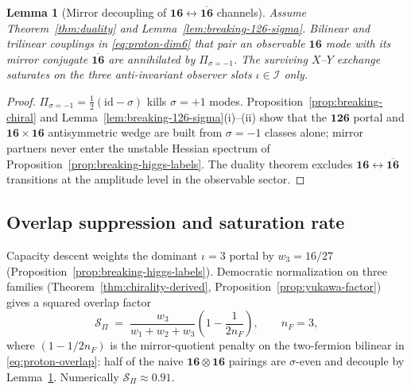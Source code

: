 \documentclass[11pt]{article}
\theoremstyle{plain}
\newtheorem{lemma}[theorem]{Lemma}
\theoremstyle{definition}
\theoremstyle{remark}
\numberwithin{equation}{section}
\begin{document}
\begin{lemma}[Mirror decoupling of $\mathbf{16}\leftrightarrow\overline{\mathbf{16}}$
channels]\label{lem:proton-mirror}
Assume Theorem~\ref{thm:duality} and Lemma~\ref{lem:breaking-126-sigma}.
Bilinear and trilinear couplings in \eqref{eq:proton-dim6} that pair an
observable $\mathbf{16}$ mode with its mirror conjugate
$\overline{\mathbf{16}}$ are annihilated by $\Pi_{\sigma=-1}$. The surviving
$X$--$Y$ exchange saturates on the three anti-invariant observer slots
$\iota\in\mathcal{I}$ only.
\end{lemma}

\begin{proof}
$\Pi_{\sigma=-1}=\tfrac12(\mathrm{id}-\sigma)$ kills $\sigma=+1$ modes.
Proposition~\ref{prop:breaking-chiral} and
Lemma~\ref{lem:breaking-126-sigma}(i)--(ii) show that the $\mathbf{126}$
portal and $\mathbf{16}\times\mathbf{16}$ antisymmetric wedge are built from
$\sigma=-1$ classes alone; mirror partners never enter the unstable Hessian
spectrum of Proposition~\ref{prop:breaking-higgs-labels}. The duality theorem
excludes $\mathbf{16}\leftrightarrow\overline{\mathbf{16}}$ transitions at the
amplitude level in the observable sector.
\end{proof}

\subsection{Overlap suppression and saturation rate}
\label{sec:proton-decay:saturation}

Capacity descent weights the dominant $\iota=3$ portal by
$w_3=16/27$ (Proposition~\ref{prop:breaking-higgs-labels}). Democratic
normalization on three families (Theorem~\ref{thm:chirality-derived},
Proposition~\ref{prop:yukawa-factor}) gives a squared overlap factor
\begin{equation}\label{eq:proton-SPi}
  \mathcal{S}_\Pi
  \;=\;
  \frac{w_3}{w_1+w_2+w_3}
  \left(1-\frac{1}{2n_F}\right),
  \qquad
  n_F=3,
\end{equation}
where $(1-1/2n_F)$ is the mirror-quotient penalty on the two-fermion bilinear
in \eqref{eq:proton-overlap}: half of the naive $\mathbf{16}\otimes\mathbf{16}$
pairings are $\sigma$-even and decouple by Lemma~\ref{lem:proton-mirror}.
Numerically $\mathcal{S}_\Pi\approx 0.91$.
\end{document}
